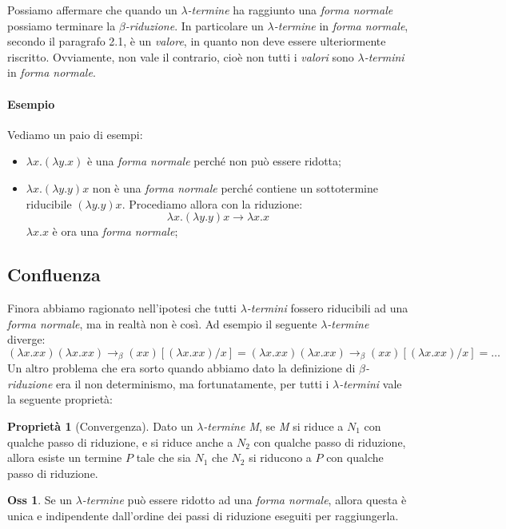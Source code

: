 \documentclass[12pt, a4paper]{report}
\theoremstyle{definition}
\newtheorem*{observation}{Oss}
\newtheorem*{property}{Proprietà}
\newcommand{\red}{\to_\beta}
\begin{document}
Possiamo affermare che quando un \emph{$\lambda$-termine} ha raggiunto una
\emph{forma normale} possiamo terminare la \emph{$\beta$-riduzione}. In particolare
un \emph{$\lambda$-termine} in \emph{forma normale}, secondo il paragrafo 2.1,
è un \emph{valore}, in quanto non deve essere ulteriormente riscritto. Ovviamente,
non vale il contrario, cioè non tutti i \emph{valori} sono \emph{$\lambda$-termini}
in \emph{forma normale}.

\paragraph{Esempio}
Vediamo un paio di esempi:
\begin{itemize}
    \item \(\lambda x.(\lambda y.x)\) è una \emph{forma normale} perché non può
    essere ridotta;
    \item \(\lambda x.(\lambda y.y)x\) non è una \emph{forma normale} perché
    contiene un sottotermine riducibile \((\lambda y.y)x\). Procediamo allora con
    la riduzione:
    \[\lambda x.(\lambda y.y)x\to\lambda x.x\]
    \(\lambda x.x\) è ora una \emph{forma normale};
\end{itemize}

\subsection{Confluenza}
Finora abbiamo ragionato nell'ipotesi che tutti \emph{$\lambda$-termini} fossero
riducibili ad una \emph{forma normale}, ma in realtà non è così. Ad esempio il
seguente \emph{$\lambda$-termine} diverge:
\[(\lambda x.xx)(\lambda x.xx)\red(xx)[(\lambda x.xx)/x]=(\lambda x.xx)(\lambda
x.xx)\red(xx)[(\lambda x.xx)/x]=\dots\]
Un altro problema che era sorto quando abbiamo dato la definizione di
\emph{$\beta$-riduzione} era il non determinismo, ma fortunatamente, per tutti i
\emph{$\lambda$-termini} vale la seguente proprietà:
\begin{property}[Convergenza]
    Dato un \emph{$\lambda$-termine M}, se \emph{M} si riduce a $N_1$ con qualche
    passo di riduzione, e si riduce anche a $N_2$ con qualche passo di riduzione,
    allora esiste un termine $P$ tale che sia $N_1$ che $N_2$ si riducono a $P$
    con qualche passo di riduzione.
\end{property}

\begin{observation}
    Se un \emph{$\lambda$-termine} può essere ridotto ad una \emph{forma normale},
    allora questa è unica e indipendente dall'ordine dei passi di riduzione
    eseguiti per raggiungerla.
\end{observation}
\end{document}
